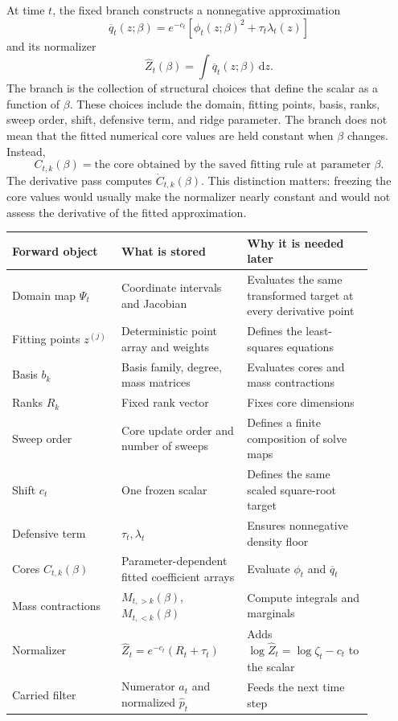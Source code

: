 \documentclass[11pt]{article}
\numberwithin{equation}{section}
\newcommand{\dd}{\,\mathrm d}
\begin{document}
At time \(t\), the fixed branch constructs a nonnegative approximation
\begin{equation}
    \overline q_t(z;\beta)
    =
    e^{-c_t}\left[\phi_t(z;\beta)^2+\tau_t\lambda_t(z)\right]
    \label{eq:p24-p19-44}
\end{equation}
and its normalizer
\begin{equation}
    \widehat Z_t(\beta)=\int \overline q_t(z;\beta)\dd z.
    \label{eq:p24-p19-45}
\end{equation}
The branch is the collection of structural choices that define the scalar as a
function of \(\beta\).  These choices include the domain, fitting points, basis,
ranks, sweep order, shift, defensive term, and ridge parameter.  The branch does
not mean that the fitted numerical core values are held constant when
\(\beta\) changes.  Instead,
\begin{equation}
    C_{t,k}(\beta)
    =
    \text{the core obtained by the saved fitting rule at parameter }\beta.
    \label{eq:p24-p19-45a}
\end{equation}
The derivative pass computes \(\dot C_{t,k}(\beta)\).  This distinction matters:
freezing the core values would usually make the normalizer nearly constant and
would not assess the derivative of the fitted approximation.

\begin{center}
\begin{tabular}{p{0.27\linewidth}p{0.31\linewidth}p{0.31\linewidth}}
\toprule
Forward object & What is stored & Why it is needed later\\
\midrule
Domain map \(\Psi_t\) & Coordinate intervals and Jacobian & Evaluates the same transformed target at every derivative point\\
Fitting points \(z^{(j)}\) & Deterministic point array and weights & Defines the least-squares equations\\
Basis \(b_k\) & Basis family, degree, mass matrices & Evaluates cores and mass contractions\\
Ranks \(R_k\) & Fixed rank vector & Fixes core dimensions\\
Sweep order & Core update order and number of sweeps & Defines a finite composition of solve maps\\
Shift \(c_t\) & One frozen scalar & Defines the same scaled square-root target\\
Defensive term & \(\tau_t,\lambda_t\) & Ensures nonnegative density floor\\
Cores \(C_{t,k}(\beta)\) & Parameter-dependent fitted coefficient arrays & Evaluate \(\phi_t\) and \(\overline q_t\)\\
Mass contractions & \(M_{t,>k}(\beta)\), \(M_{t,<k}(\beta)\) & Compute integrals and marginals\\
Normalizer & \(\widehat Z_t=e^{-c_t}(R_t+\tau_t)\) & Adds \(\log\widehat Z_t=\log\zeta_t-c_t\) to the scalar\\
Carried filter & Numerator \(a_t\) and normalized \(\widehat p_t\) & Feeds the next time step\\
\bottomrule
\end{tabular}
\end{center}
\end{document}

